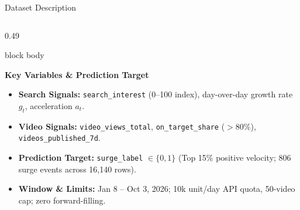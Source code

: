 \documentclass[aspectratio=169, 10pt]{beamer}
\newenvironment{card}[1][]{%
    \begin{beamercolorbox}[rounded=true,shadow=false,wd=\linewidth,sep=4pt,#1]{block body}%
}{%
    \end{beamercolorbox}%
}
\begin{document}
\begin{frame}{Dataset Description}
\begin{columns}[T]
        \begin{column}{0.49\textwidth}
            \begin{card}
                {\fontsize{8.5pt}{10pt}\selectfont \textbf{\color{NavyPrimary}Key Variables \& Prediction Target}}\\[0.08cm]
                \begin{itemize}\setlength{\itemsep}{2pt}
                    \item \textbf{Search Signals:} \texttt{search\_interest} (0--100 index), day-over-day growth rate $g_t$, acceleration $a_t$.
                    \item \textbf{Video Signals:} \texttt{video\_views\_total}, \texttt{on\_target\_share} ($>80\%$), \texttt{videos\_published\_7d}.
                    \item \textbf{Prediction Target:} \texttt{surge\_label} $\in \{0, 1\}$ (Top 15\% positive velocity; 806 surge events across 16,140 rows).
                    \item \textbf{Window \& Limits:} Jan 8 -- Oct 3, 2026; 10k unit/day API quota, 50-video cap; zero forward-filling.
                \end{itemize}
            \end{card}
        \end{column}
    \end{columns}
\end{frame}
\end{document}

